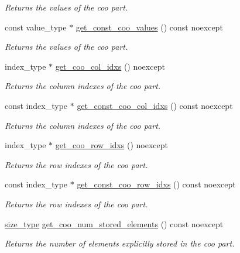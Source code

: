 \begin{DoxyCompactItemize}
\begin{DoxyCompactList}\small\item\em Returns the values of the coo part. \end{DoxyCompactList}\item 
const value\+\_\+type $\ast$ \hyperlink{classgko_1_1matrix_1_1Hybrid_a9b066402b6f3727196c9945a80f08a6e}{get\+\_\+const\+\_\+coo\+\_\+values} () const noexcept
\begin{DoxyCompactList}\small\item\em Returns the values of the coo part. \end{DoxyCompactList}\item 
index\+\_\+type $\ast$ \hyperlink{classgko_1_1matrix_1_1Hybrid_a327548f42867b201cd469f3a21145c87}{get\+\_\+coo\+\_\+col\+\_\+idxs} () noexcept
\begin{DoxyCompactList}\small\item\em Returns the column indexes of the coo part. \end{DoxyCompactList}\item 
const index\+\_\+type $\ast$ \hyperlink{classgko_1_1matrix_1_1Hybrid_ab637e1576b6449407ee2b57ac203e0f7}{get\+\_\+const\+\_\+coo\+\_\+col\+\_\+idxs} () const noexcept
\begin{DoxyCompactList}\small\item\em Returns the column indexes of the coo part. \end{DoxyCompactList}\item 
index\+\_\+type $\ast$ \hyperlink{classgko_1_1matrix_1_1Hybrid_aa64e1442587df4be9bc55f38d91be26d}{get\+\_\+coo\+\_\+row\+\_\+idxs} () noexcept
\begin{DoxyCompactList}\small\item\em Returns the row indexes of the coo part. \end{DoxyCompactList}\item 
const index\+\_\+type $\ast$ \hyperlink{classgko_1_1matrix_1_1Hybrid_ae0d4b0c9151011ef879055f504f79f63}{get\+\_\+const\+\_\+coo\+\_\+row\+\_\+idxs} () const noexcept
\begin{DoxyCompactList}\small\item\em Returns the row indexes of the coo part. \end{DoxyCompactList}\item 
\hyperlink{namespacegko_a6e5c95df0ae4e47aab2f604a22d98ee7}{size\+\_\+type} \hyperlink{classgko_1_1matrix_1_1Hybrid_a2fe06adb3323dcad710329e33a12dff4}{get\+\_\+coo\+\_\+num\+\_\+stored\+\_\+elements} () const noexcept
\begin{DoxyCompactList}\small\item\em Returns the number of elements explicitly stored in the coo part. \end{DoxyCompactList}\item 

\end{DoxyCompactItemize}
